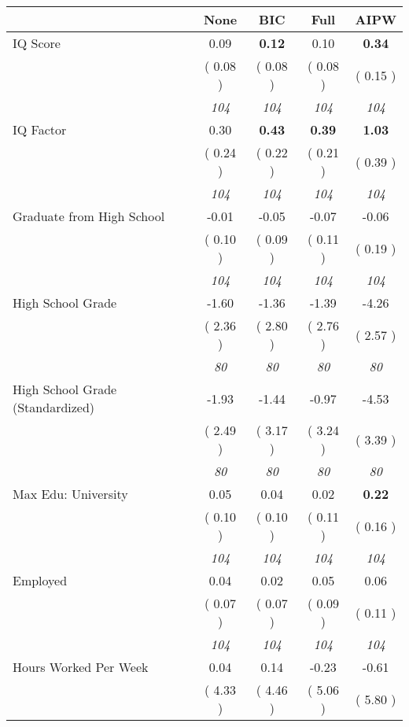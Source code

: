 \begin{tabular}{l c c c c}
\toprule
 & None & BIC & Full & AIPW \\
\midrule
IQ Score &      0.09 & \textbf{      0.12 } &      0.10 & \textbf{     0.34} \\
& (     0.08 ) & (     0.08 ) & (     0.08 ) & (     0.15 ) \\
& \textit{ 104 } & \textit{ 104 } & \textit{ 104 } & \textit{ 104 } \\
IQ Factor &      0.30 & \textbf{      0.43 } & \textbf{      0.39 } & \textbf{     1.03} \\
& (     0.24 ) & (     0.22 ) & (     0.21 ) & (     0.39 ) \\
& \textit{ 104 } & \textit{ 104 } & \textit{ 104 } & \textit{ 104 } \\
Graduate from High School &     -0.01 &     -0.05 &     -0.07 &     -0.06 \\
& (     0.10 ) & (     0.09 ) & (     0.11 ) & (     0.19 ) \\
& \textit{ 104 } & \textit{ 104 } & \textit{ 104 } & \textit{ 104 } \\
High School Grade &     -1.60 &     -1.36 &     -1.39 &     -4.26 \\
& (     2.36 ) & (     2.80 ) & (     2.76 ) & (     2.57 ) \\
& \textit{ 80 } & \textit{ 80 } & \textit{ 80 } & \textit{ 80 } \\
High School Grade (Standardized) &     -1.93 &     -1.44 &     -0.97 &     -4.53 \\
& (     2.49 ) & (     3.17 ) & (     3.24 ) & (     3.39 ) \\
& \textit{ 80 } & \textit{ 80 } & \textit{ 80 } & \textit{ 80 } \\
Max Edu: University &      0.05 &      0.04 &      0.02 & \textbf{     0.22} \\
& (     0.10 ) & (     0.10 ) & (     0.11 ) & (     0.16 ) \\
& \textit{ 104 } & \textit{ 104 } & \textit{ 104 } & \textit{ 104 } \\
Employed &      0.04 &      0.02 &      0.05 &      0.06 \\
& (     0.07 ) & (     0.07 ) & (     0.09 ) & (     0.11 ) \\
& \textit{ 104 } & \textit{ 104 } & \textit{ 104 } & \textit{ 104 } \\
Hours Worked Per Week &      0.04 &      0.14 &     -0.23 &     -0.61 \\
& (     4.33 ) & (     4.46 ) & (     5.06 ) & (     5.80 ) \\

\end{tabular}
